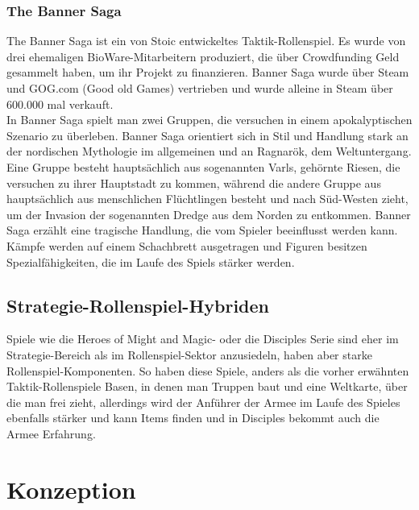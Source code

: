 \documentclass[extern,palatino]{cgBA}
\begin{document}
\subsubsection{The Banner Saga}
The Banner Saga ist ein von Stoic entwickeltes Taktik-Rollenspiel. Es wurde von drei ehemaligen BioWare-Mitarbeitern produziert, die über Crowdfunding Geld gesammelt haben, um ihr Projekt zu finanzieren. Banner Saga wurde über Steam und GOG.com (Good old Games) vertrieben und wurde alleine in Steam über 600.000 mal verkauft.
\\In Banner Saga spielt man zwei Gruppen, die versuchen in einem apokalyptischen Szenario zu überleben. Banner Saga orientiert sich in Stil und Handlung stark an der nordischen Mythologie im allgemeinen und an Ragnarök, dem Weltuntergang. Eine Gruppe besteht hauptsächlich aus sogenannten Varls, gehörnte Riesen, die versuchen zu ihrer Hauptstadt zu kommen, während die andere Gruppe aus hauptsächlich aus menschlichen Flüchtlingen besteht und nach Süd-Westen zieht, um der Invasion der sogenannten Dredge aus dem Norden zu entkommen.
Banner Saga erzählt eine tragische Handlung, die vom Spieler beeinflusst werden kann. Kämpfe werden auf einem Schachbrett ausgetragen und Figuren besitzen Spezialfähigkeiten, die im Laufe des Spiels stärker werden. 
\subsection{Strategie-Rollenspiel-Hybriden} Spiele wie die Heroes of Might and Magic- oder die Disciples Serie sind eher im Strategie-Bereich als im Rollenspiel-Sektor anzusiedeln, haben aber starke Rollenspiel-Komponenten. So haben diese Spiele, anders als die vorher erwähnten Taktik-Rollenspiele Basen, in denen man Truppen baut und eine Weltkarte, über die man frei zieht, allerdings wird der Anführer der Armee im Laufe des Spieles ebenfalls stärker und kann Items finden und in Disciples bekommt auch die Armee Erfahrung.


\newpage
\section {Konzeption}
\end{document}
